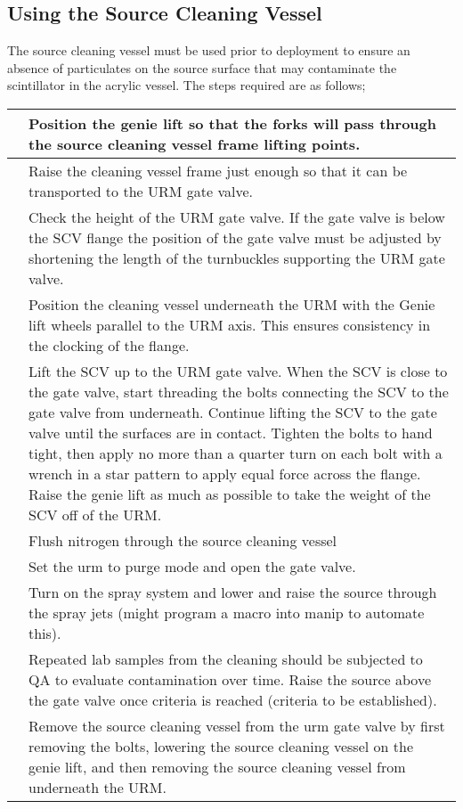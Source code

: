  \subsection{Using the Source Cleaning Vessel}
 The source cleaning vessel must be used prior to deployment to ensure an absence of particulates on the source surface that may contaminate the scintillator in the acrylic vessel. The steps required are as follows;
 \begin{tabular}{|c|p{4cm}|}
 \hline
& Position the genie lift so that the forks will pass through the source cleaning vessel frame lifting points. \\ \hline
& Raise the cleaning vessel frame just enough so that it can be transported to the URM gate valve. \\ \hline
& Check the height of the URM gate valve. If the gate valve is below the SCV flange the position of the gate valve must be adjusted by shortening the length of the turnbuckles supporting the URM gate valve. \\ \hline
& Position the cleaning vessel underneath the URM with the Genie lift wheels parallel to the URM axis. This ensures consistency in the clocking of the flange. \\ \hline
& Lift the SCV up to the URM gate valve. When the SCV is close to the gate valve, start threading the bolts connecting the SCV to the gate valve from underneath. Continue lifting the SCV to the gate valve until the surfaces are in contact. Tighten the bolts to hand tight, then apply no more than a quarter turn on each bolt with a wrench in a star pattern to apply equal force across the flange. Raise the genie lift as much as possible to take the weight of the SCV off of the URM.\\ \hline
& Flush nitrogen through the source cleaning vessel \\ \hline
&  Set the urm to purge mode and open the gate valve. \\ \hline
& Turn on the spray system and lower and raise the source through the spray jets (might program a macro into manip to automate this). \\ \hline
& Repeated lab samples from the cleaning should be subjected to QA to evaluate contamination over time. Raise the source above the gate valve once criteria is reached (criteria to be established).  \\ \hline
& Remove the source cleaning vessel from the urm gate valve by first removing the bolts, lowering the source cleaning vessel on the genie lift, and then removing the source cleaning vessel from underneath the URM. \\ \hline 
  \end{tabular}
  
